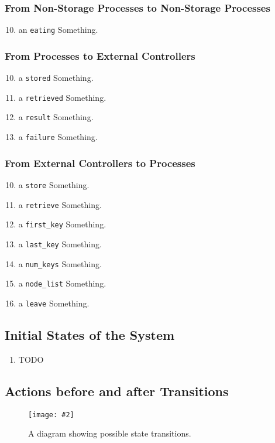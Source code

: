 \documentclass[11pt]{article}
\newcommand{\pic}[2]{\begin{center}\texttt{[image: \#2]}\end{center}}
\begin{document}
\subsubsection{From Non-Storage Processes to Non-Storage Processes}
\begin{enumerate}[M1]
\setcounter{enumi}{9}
\item an \texttt{eating} Something.
\end{enumerate}


\subsubsection{From Processes to External Controllers}
\begin{enumerate}[M1]
\setcounter{enumi}{9}
\item a \texttt{stored} Something.
\item a \texttt{retrieved} Something.
\item a \texttt{result} Something.
\item a \texttt{failure} Something.
\end{enumerate}

\subsubsection{From External Controllers to Processes}
\begin{enumerate}[M1]
\setcounter{enumi}{9}
\item a \texttt{store} Something.
\item a \texttt{retrieve} Something.
\item a \texttt{first\_key} Something.
\item a \texttt{last\_key} Something.
\item a \texttt{num\_keys} Something.
\item a \texttt{node\_list} Something.
\item a \texttt{leave} Something.
\end{enumerate}

\subsection{Initial States of the System}
\begin{enumerate}
\item TODO
\end{enumerate}

\subsection{Actions before and after Transitions}
\begin{figure}[H]
\pic{0.6}{diagram}
\label{fig:diagram}
\caption{A diagram showing possible state transitions.}
\end{figure}
\end{document}
